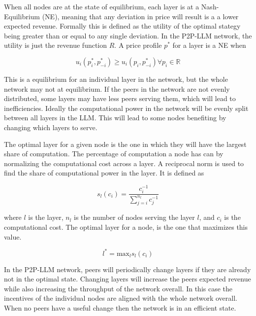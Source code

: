 \documentclass[preprint,twoside,11pt]{article}
\begin{document}
When all nodes are at the state of equilibrium, each layer is at a Nash-Equilibrium (NE), meaning that any deviation in price
will result is a a lower expected revenue. Formally this is defined as the utility of the optimal stategy being greater than or equal to any single deviation.
In the P2P-LLM network, the utility is just the revenue function $R$.
A price profile $p^*$ for a layer is a NE when

\begin{equation}
	u_i(p_i^*, p^*_{-i}) \geq u_i(p_i, p^*_{-i}) \forall p_i \in \mathbb{R}
\end{equation}

This is a equilibrium for an individual layer in the network, but the whole network may
not at equilibrium. If the peers in the network are not evenly distributed,
some layers may have less peers serving them, which will lead to inefficiencies.
Ideally the computational power in the network will be evenly split between all layers
in the LLM. This will lead to some nodes benefiting by changing which layers to serve.

The optimal layer for a given node is the one in which they will have the largest
share of computation. The percentage of computation a node has can by normalizing the
computational cost across a layer. A reciprocal norm is used to find the share of computational power in the layer.
It is defined as

\begin{equation}
	s_l(c_i) = \frac{c_i^{-1}}{\sum_{j=i}^{n_l}c_j^{-1}}
	\label{eq:norm}
\end{equation}

where $l$ is the layer, $n_l$ is the number of nodes serving the layer $l$, and $c_i$ is the computational cost.
The optimal layer for a node, is the one that maximizes this value.

\begin{equation}
	l^* = \text{max}_l s_l(c_i)
	\label{eq:max}
\end{equation}

In the P2P-LLM network, peers will periodically change layers if they are already not in the optimal state.
Changing layers will increase the peers expected revenue while also increasing the throughput of the network overall.
In this case the incentives of the individual nodes are aligned with the whole network overall.
When no peers have a useful change then the network is in an efficient state.
\end{document}
